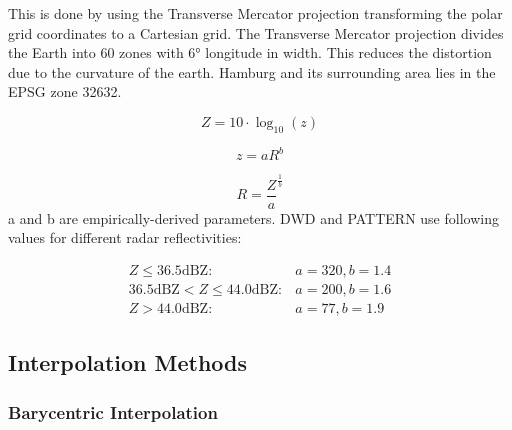 \documentclass[11pt,twoside,a4paper,fleqn]{report}
\numberwithin{equation}{chapter}
\numberwithin{figure}{chapter}
\numberwithin{table}{chapter}
\begin{document}
This is done by using the Transverse Mercator projection transforming the polar grid coordinates to a Cartesian grid. The Transverse Mercator projection divides the Earth into 60 zones with  6° longitude in width. This reduces the distortion due to the curvature of the earth. Hamburg and its surrounding area lies in the EPSG zone 32632. 



\begin{equation}
	Z  = 10 \cdot \log _{10}(z)
\end{equation}

\begin{equation}
	z = aR^{b}
\end{equation}

\begin{equation}
	R = \frac{Z}{a}^{\frac{1}{b}}
\end{equation}
a and b are empirically-derived parameters. DWD and PATTERN use following values for different radar reflectivities:

\begin{equation}
	\begin{array}{lcl}
		Z \le 36.5 \text{dBZ}: & a = 320, b = 1.4 \\
		36.5 \text{dBZ} < Z \le 44.0 \text{dBZ}: & a  = 200, b = 1.6 \\
		Z > 44.0 \text{dBZ}: & a = 77, b = 1.9
	\end{array}
\end{equation}

\subsection{Interpolation Methods}
\subsubsection{Barycentric Interpolation}

\begin{center}
	
	
\end{center}
\end{document}

